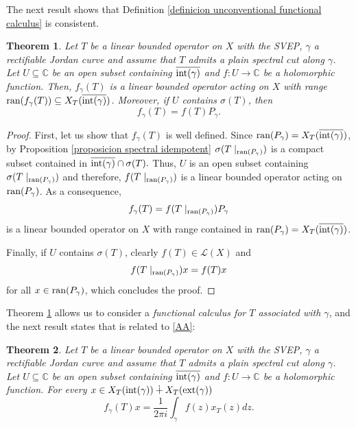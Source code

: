 \documentclass[11pt]{amsart}
\newtheorem{theorem}{Theorem}[section]
\theoremstyle{definition}
\theoremstyle{remark}
\numberwithin{equation}{section}
\newcommand{\ran}{\textnormal{ran}}
\newcommand{\EL}{\mathcal{L}}
\newcommand{\C}{\mathbb{C}}
\newcommand{\inte}{\textnormal{int}}
\newcommand{\exte}{\textnormal{ext}}
\begin{document}
\smallskip
	
The next result shows that Definition \ref{definicion unconventional functional calculus} is consistent.

\smallskip
	
\begin{theorem}\label{teorema calculo bien definido}
		Let $T$ be a linear bounded operator on $X$ with the SVEP, $\gamma$ a rectifiable Jordan curve and assume that $T$ admits a plain spectral cut along $\gamma$. Let $U\subseteq  \C$ be an open subset containing $\overline{\inte(\gamma)}$ and $f: U \rightarrow \C$ be a holomorphic function. Then, $f_\gamma(T)$ is a linear bounded operator acting on $X$ with range $\ran(f_\gamma(T))\subseteq   {X_T(\overline{\inte(\gamma)})}$. Moreover, if $U$ contains $\sigma(T)$, then
		$$
		f_\gamma(T) = f(T)P_\gamma.
		$$
\end{theorem}


\begin{proof}
		First, let us show that  $f_\gamma(T)$ is well defined. Since $\ran(P_\gamma) = {X_T(\overline{\inte(\gamma)})}$, by Proposition \ref{proposicion spectral idempotent} $\sigma(T\mid_{\ran(P_\gamma)})$ is a compact subset contained in $\overline{\inte(\gamma)}\cap\sigma(T).$ Thus, $U$ is an open subset containing \mbox{$\sigma(T\mid_{\ran(P_\gamma)})$} and therefore, $f(T\mid_{\ran(P_\gamma)})$ is a linear bounded operator acting on $\ran(P_\gamma)$.
As a consequence,
$$f_\gamma(T)= f(T\mid_{\ran(P_\gamma)})P_\gamma$$
is a linear bounded operator on $X$ with range contained in $\ran(P_\gamma) = X_T(\overline{\inte(\gamma)})$.

\smallskip		

Finally, if $U$ contains $\sigma(T)$, clearly $f(T) \in \EL(X)$ and
		$$f(T\mid_{\ran(P_\gamma)})x = f(T)x$$
		for all $x\in \ran(P_\gamma)$, which concludes the proof.
	\end{proof}


Theorem \ref{teorema calculo bien definido} allows us to consider a \emph{functional calculus for $T$ associated with $\gamma$}, and the next result states that is related to \eqref{AA}:
	
\begin{theorem}\label{teorema expresion integral calculo funcional inconvencional}
		Let $T$ be a linear bounded operator on $X$ with the SVEP, $\gamma$ a rectifiable Jordan curve and assume that $T$ admits a plain spectral cut along $\gamma$. Let $U\subseteq  \C$ be an open subset containing $\overline{\inte(\gamma)}$ and $f: U \rightarrow \C$ be a holomorphic function. For every $x\in X_T(\inte(\gamma))\dotplus X_T(\exte(\gamma))$
		\begin{equation}\label{expresion integral calculo funcional inconvencional}
			f_\gamma(T) x = \frac{1}{2\pi i}\int_\gamma f(z) x_T(z)dz.
		\end{equation}
	\end{theorem}
\end{document}
